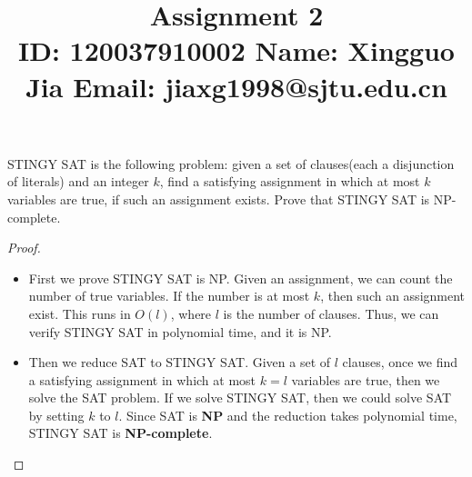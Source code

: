 \documentclass{article}
\title{{\bf Assignment 2} \\ {\large ID: 120037910002 } {\large Name: Xingguo Jia } {\large Email: jiaxg1998@sjtu.edu.cn}}
\author{}
\date{}
\newcounter{exercise}
\newcommand{\<}{
    \langle}
\renewcommand{\>}{
    \rangle}
\begin{document}
\maketitle


{\large





\begin{exercise}
\textsf{STINGY SAT} is the following problem: given a set of clauses(each a disjunction of literals) and an integer $k$, find a satisfying assignment in which at most 
$k$ variables are true, if such an assignment exists. Prove that \textsf{STINGY SAT} is NP-complete.
\end{exercise}
\begin{proof}
    \leavevmode\newline
    \begin{itemize}
        \item First we prove {STINGY SAT} is NP. Given an assignment, we can count the number of true variables. If the number is at most $k$, then such an assignment exist. This runs in  $O(l)$, where $l$ is the number of clauses. Thus, we can verify {STINGY SAT} in polynomial time, and it is NP.
        \item Then we reduce {SAT} to {STINGY SAT}. Given a set of $l$ clauses, once we find a satisfying assignment in which at most $k=l$ variables are true, then we solve the SAT problem. If we solve {STINGY SAT}, then we could solve {SAT} by setting $k$ to $l$. Since {SAT} is \textbf{NP} and the reduction takes polynomial time, {STINGY SAT} is \textbf{NP-complete}.
    \end{itemize}
\end{proof}
\newpage

}
\end{document}

